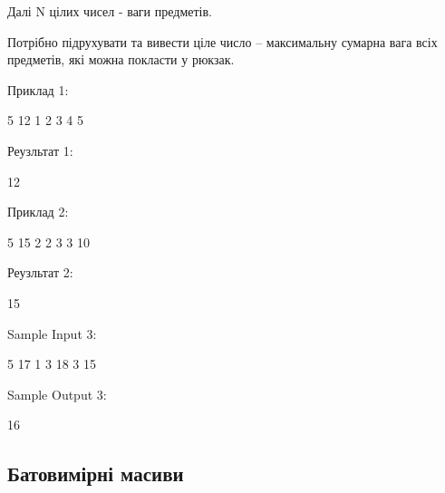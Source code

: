 \documentclass[]{article}
\begin{document}
\begin{enumerate}
Далі N цілих чисел - ваги предметів.

Потрібно підрухувати та вивести ціле число – максимальну сумарна вага всіх предметів, які можна покласти у рюкзак.

Приклад 1: 

5 12
1 2 3 4 5

Реузльтат 1:

12

Приклад 2:

5 15
2 2 3 3 10

Реузльтат 2:

15

Sample Input 3:

5 17
1 3 18 3 15

Sample Output 3:

16 


\end{enumerate}

\subsection{Батовимірні масиви}
\end{document}
